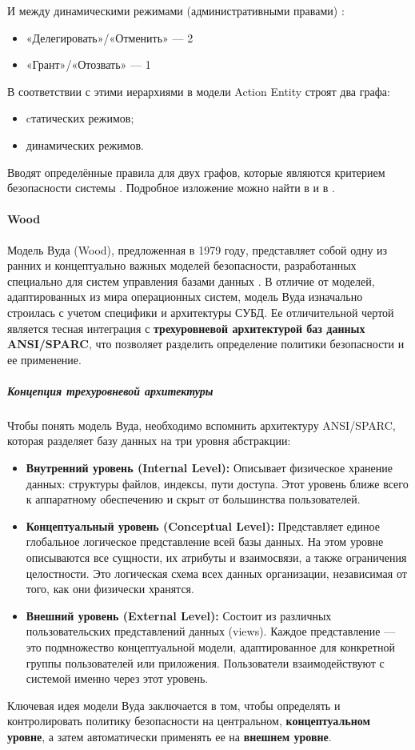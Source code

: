 И между динамическими режимами (административными правами) \autocite{Jalili}:
\begin{itemize}
    \item «Делегировать»/«Отменить» --- 2
    \item «Грант»/«Отозвать» --- 1
\end{itemize}

В соответствии с этими иерархиями в модели Action Entity строят два графа:
\begin{itemize}
    \item cтатических режимов;
    \item динамических режимов.
\end{itemize}

Вводят определённые правила для двух графов, которые являются критерием безопасности системы \autocite{SecModels}.
Подробное изложение можно найти в \autocite{SecModels} и в \autocite{Jalili}.

\paragraph{Wood}



Модель Вуда (Wood), предложенная в 1979 году, представляет собой одну из ранних и концептуально важных моделей безопасности, разработанных специально для систем управления базами данных \autocite{Jalili}. В отличие от моделей, адаптированных из мира операционных систем, модель Вуда изначально строилась с учетом специфики и архитектуры СУБД. Ее отличительной чертой является тесная интеграция с \textbf{трехуровневой архитектурой баз данных ANSI/SPARC}, что позволяет разделить определение политики безопасности и ее применение.

\subparagraph{Концепция трехуровневой архитектуры}
Чтобы понять модель Вуда, необходимо вспомнить архитектуру ANSI/SPARC, которая разделяет базу данных на три уровня абстракции:

\begin{itemize}
	\item \textbf{Внутренний уровень (Internal Level):} Описывает физическое хранение данных: структуры файлов, индексы, пути доступа. Этот уровень ближе всего к аппаратному обеспечению и скрыт от большинства пользователей.
	\item \textbf{Концептуальный уровень (Conceptual Level):} Представляет единое глобальное логическое представление всей базы данных. На этом уровне описываются все сущности, их атрибуты и взаимосвязи, а также ограничения целостности. Это логическая схема всех данных организации, независимая от того, как они физически хранятся.
	\item \textbf{Внешний уровень (External Level):} Состоит из различных пользовательских представлений данных (views). Каждое представление --- это подмножество концептуальной модели, адаптированное для конкретной группы пользователей или приложения. Пользователи взаимодействуют с системой именно через этот уровень.
\end{itemize}
Ключевая идея модели Вуда заключается в том, чтобы определять и контролировать политику безопасности на центральном, \textbf{концептуальном уровне}, а затем автоматически применять ее на \textbf{внешнем уровне}.

